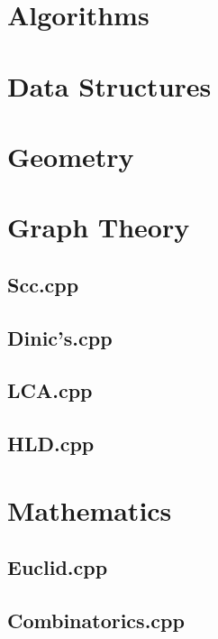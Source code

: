 \section{Algorithms}
\section{Data Structures}
\section{Geometry}
\section{Graph Theory}
\subsection{Scc.cpp}

\subsection{Dinic's.cpp}

\subsection{LCA.cpp}

\subsection{HLD.cpp}

\section{Mathematics}
\subsection{Euclid.cpp}

\subsection{Combinatorics.cpp}

